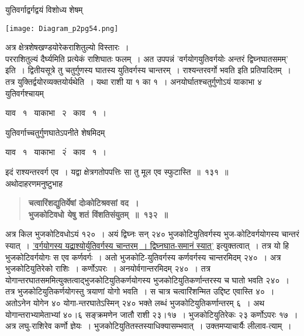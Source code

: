 \documentclass[11pt, openany]{book}
\begin{document}
\begin{sloppypar}
युतिवर्गाद्वर्गद्वयं विशोध्य शेषम्

\begin{center}
    \texttt{[image: Diagram\_p2pg54.png]}
\end{center}

अत्र क्षेत्रशेषखण्डयोरेकराशितुल्यो विस्तारः~।\\

परराशितुल्यं दैर्घ्यमिति प्रत्येकं राशिघातः फलम्~। अत उपपन्नं 'वर्गयोगयुतिवर्गयोः अन्तरं द्विघ्नघातसमम्' इति~। द्वितीयसूत्रे तु चतुर्गुणस्य घातस्य युतिवर्गस्य चान्तरम्~। राश्यन्तरवर्गो भवति इति प्रतिपादितम्~। तत्र युक्तिर्द्वयोरव्यक्तयोर्यथेति~। यथा राशी या १ का १~। अनयोर्घातश्चतुर्गुणोऽयं याकाभा ४ युतिवर्गश्चायम्
\vspace{-2mm}
 
\begin{center}
याव ~१ ~याकाभा ~२ ~काव ~१~।
\end{center}
\vspace{-2mm}

युतिवर्गाच्चतुर्गुणघातेऽपनीते शेषमिदम्
\vspace{-2mm}

\begin{center}
याव ~१ ~याकाभा ~२ं ~काव ~१~।
\end{center}
\vspace{-2mm}

इदं राश्यन्तरवर्ग एव~। यद्वा क्षेत्रगतोपपत्तिः सा तु मूल एव स्फुटास्ति~॥~१३१~॥\\

{\small अथोदाहरणमनुष्टुभाह\textendash }

 \label{8.132}
\begin{quote}
{\large \textbf{{\color{purple}चत्वारिंशद्युतिर्येषां दोःकोटिश्रवसां वद~।\\
भुजकोटिवधो येषु शतं विंशतिसंयुतम्~॥~१३२~॥}}}
\end{quote}

अत्र किल भुजकोटिवधोऽयं १२०~। अयं द्विघ्नः सन् २४० भुजकोटियुतिवर्गस्य भुज-कोटिवर्गयोगस्य चान्तरं स्यात्~। \hyperref[8.131]{'वर्गयोगस्य यद्राश्योर्युतिवर्गस्य चान्तरम्~। द्विघ्नघात-समानं स्यात्'} इत्युक्तत्वात्~। तत्र यो हि भुजकोटिवर्गयोगः स एव कर्णवर्गः~। अतो भुजकोटि-युतिवर्गस्य कर्णवर्गस्य चान्तरमिदम् २४०~। अत्र भुजकोटियुतिरेको राशिः~। कर्णोऽपरः~। अनयोर्वगान्तरमिदम् २४०~। तत्र योगान्तरघातसममित्युक्तत्वाद्भुजकोटियुतिकर्णयोगस्य भुजकोटियुतिकर्णान्तरस्य च घातो भवति २४०~। तत्र भुजकोटियुतिकर्णयोगस्तु त्रयाणां योगो भवति~। स चात्र चत्वारिंशन्मित उद्दिष्ट एवास्ति ४०~। अतोऽनेन योगेन ४० योगा-न्तरघातेऽस्मिन् २४० भक्ते लब्धं भुजकोटियुतिकर्णान्तरम् ६~। अथ योगान्तराभ्यामेताभ्यां ४०।६ सङ्क्रमणेन जातौ राशी २३।१७~। भुजकोटियुतिरेकः २३ कर्णोऽपरः १७~। अत्र लघु-राशिरेव कर्णो ज्ञेयः~। भुजकोटियुतितस्तस्याधिक्यासम्भवात्~। उक्तमप्याचार्यैः {\color{violet}लीलाव-त्याम्}~।
\end{sloppypar}
\end{document}
